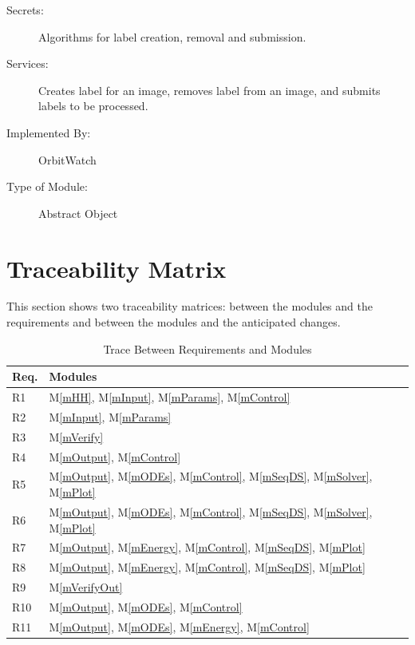\documentclass[12pt, titlepage]{article}
\newcommand{\mref}[1]{M\ref{#1}}
\begin{document}
\begin{description}
\item[Secrets:] Algorithms for label creation, removal and submission.
\item[Services:] Creates label for an image, removes label from an image, and submits labels to be processed.
\item[Implemented By:] OrbitWatch
\item[Type of Module:] Abstract Object
\end{description}

\section{Traceability Matrix} \label{SecTM}

This section shows two traceability matrices: between the modules and the
requirements and between the modules and the anticipated changes.

\begin{table}[H]
\centering
\begin{tabular}{p{} p{}}
\toprule
\textbf{Req.} & \textbf{Modules}\\
\midrule
R1 & \mref{mHH}, \mref{mInput}, \mref{mParams}, \mref{mControl}\\
R2 & \mref{mInput}, \mref{mParams}\\
R3 & \mref{mVerify}\\
R4 & \mref{mOutput}, \mref{mControl}\\
R5 & \mref{mOutput}, \mref{mODEs}, \mref{mControl}, \mref{mSeqDS}, \mref{mSolver}, \mref{mPlot}\\
R6 & \mref{mOutput}, \mref{mODEs}, \mref{mControl}, \mref{mSeqDS}, \mref{mSolver}, \mref{mPlot}\\
R7 & \mref{mOutput}, \mref{mEnergy}, \mref{mControl}, \mref{mSeqDS}, \mref{mPlot}\\
R8 & \mref{mOutput}, \mref{mEnergy}, \mref{mControl}, \mref{mSeqDS}, \mref{mPlot}\\
R9 & \mref{mVerifyOut}\\
R10 & \mref{mOutput}, \mref{mODEs}, \mref{mControl}\\
R11 & \mref{mOutput}, \mref{mODEs}, \mref{mEnergy}, \mref{mControl}\\
\bottomrule
\end{tabular}
\caption{Trace Between Requirements and Modules}
\label{TblRT}
\end{table}
\end{document}
